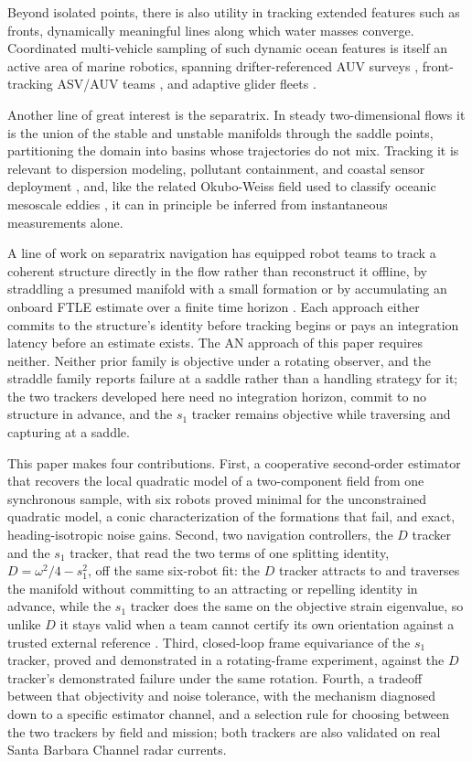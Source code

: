 \documentclass[lettersize,journal]{IEEEtran}
\begin{document}
Beyond isolated points, there is also utility in tracking extended
features such as fronts, dynamically meaningful lines along which
water masses converge. Coordinated multi-vehicle sampling of such
dynamic ocean features is itself an active area of marine robotics,
spanning drifter-referenced AUV surveys \cite{10}, front-tracking
ASV/AUV teams \cite{11}, and adaptive glider fleets \cite{12}.

Another line of great interest is the separatrix. In steady
two-dimensional flows it is the union of the stable and unstable
manifolds through the saddle points, partitioning the domain into
basins whose trajectories do not mix. Tracking it is relevant to
dispersion modeling, pollutant containment, and coastal sensor
deployment \cite{13,14,15}, and, like the related Okubo-Weiss field used
to classify oceanic mesoscale eddies \cite{16}, it can in principle be
inferred from instantaneous measurements alone.

A line of work on separatrix navigation has equipped robot teams to
track a coherent structure directly in the flow rather than
reconstruct it offline, by straddling a presumed manifold with a small
formation \cite{17,18,19,20} or by accumulating an onboard FTLE
estimate over a finite time horizon \cite{21}. Each approach either
commits to the structure's identity before tracking begins or pays an
integration latency before an estimate exists. The AN approach of this
paper requires neither. Neither prior family is objective under a
rotating observer, and the straddle family reports failure at a saddle
rather than a handling strategy for it; the two trackers developed here
need no integration horizon, commit to no structure in advance, and the
$s_1$ tracker remains objective while traversing and capturing at a
saddle.

This paper makes four contributions. First, a cooperative second-order
estimator that recovers the local quadratic model of a two-component
field from one synchronous sample, with six robots proved minimal for
the unconstrained quadratic model, a conic characterization of the
formations that fail, and exact, heading-isotropic noise gains. Second,
two navigation controllers, the $D$ tracker and the $s_1$ tracker, that
read the two terms of one splitting identity, $D = \omega^2/4 - s_1^2$,
off the same six-robot fit: the $D$ tracker attracts to and traverses
the manifold without committing to an attracting or repelling identity
in advance, while the $s_1$ tracker does the same on the objective
strain eigenvalue, so unlike $D$ it stays valid when a team cannot
certify its own orientation against a trusted external reference
\cite{10,22}. Third, closed-loop
frame equivariance of the $s_1$ tracker, proved and demonstrated in a
rotating-frame experiment, against the $D$ tracker's demonstrated
failure under the same rotation. Fourth, a tradeoff between that
objectivity and noise tolerance, with the mechanism diagnosed down to a
specific estimator channel, and a selection rule for choosing between
the two trackers by field and mission; both trackers are also validated
on real Santa Barbara Channel radar currents.
\end{document}
